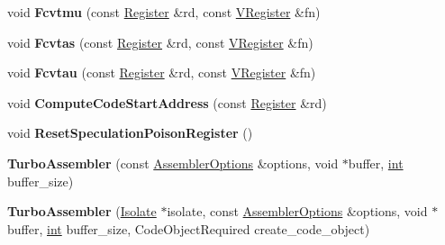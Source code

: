 \begin{DoxyCompactItemize}
\item 
\mbox{\label{classv8_1_1internal_1_1TurboAssembler_a2eac23e4dbc259c385d17cd685c34446}} 
void {\bfseries Fcvtmu} (const \mbox{\hyperlink{classv8_1_1internal_1_1Register}{Register}} \&rd, const \mbox{\hyperlink{classv8_1_1internal_1_1VRegister}{V\+Register}} \&fn)
\item 
\mbox{\label{classv8_1_1internal_1_1TurboAssembler_a9915791dbdab908645ba894f7310d8ec}} 
void {\bfseries Fcvtas} (const \mbox{\hyperlink{classv8_1_1internal_1_1Register}{Register}} \&rd, const \mbox{\hyperlink{classv8_1_1internal_1_1VRegister}{V\+Register}} \&fn)
\item 
\mbox{\label{classv8_1_1internal_1_1TurboAssembler_a38ca448ff9d44340d0ef0ea29412f2e3}} 
void {\bfseries Fcvtau} (const \mbox{\hyperlink{classv8_1_1internal_1_1Register}{Register}} \&rd, const \mbox{\hyperlink{classv8_1_1internal_1_1VRegister}{V\+Register}} \&fn)
\item 
\mbox{\label{classv8_1_1internal_1_1TurboAssembler_ad64017427df72681032af8db203979b0}} 
void {\bfseries Compute\+Code\+Start\+Address} (const \mbox{\hyperlink{classv8_1_1internal_1_1Register}{Register}} \&rd)
\item 
\mbox{\label{classv8_1_1internal_1_1TurboAssembler_a282571b73c77ef466d68a106c557956d}} 
void {\bfseries Reset\+Speculation\+Poison\+Register} ()
\item 
\mbox{\label{classv8_1_1internal_1_1TurboAssembler_ac5a1cdee47961f289dbb095cc534ef95}} 
{\bfseries Turbo\+Assembler} (const \mbox{\hyperlink{structv8_1_1internal_1_1AssemblerOptions}{Assembler\+Options}} \&options, void $\ast$buffer, \mbox{\hyperlink{classint}{int}} buffer\+\_\+size)
\item 
\mbox{\label{classv8_1_1internal_1_1TurboAssembler_ac5d3c303e7abed78a6c1fe7f9834c045}} 
{\bfseries Turbo\+Assembler} (\mbox{\hyperlink{classv8_1_1internal_1_1Isolate}{Isolate}} $\ast$isolate, const \mbox{\hyperlink{structv8_1_1internal_1_1AssemblerOptions}{Assembler\+Options}} \&options, void $\ast$buffer, \mbox{\hyperlink{classint}{int}} buffer\+\_\+size, Code\+Object\+Required create\+\_\+code\+\_\+object)

\end{DoxyCompactItemize}
